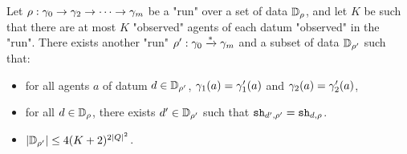 \begin{lemma}
	\label{lem:data-core-lemma}
	Let $\rho : \gamma_0 \to \gamma_2 \to \cdots \to \gamma_m$ be a "run"  over a set of data $\mathbb{D}_{\rho}$, and let $K$ be such that there are at most $K$ "observed" agents of each datum "observed" in the "run". There exists another "run" $\rho' : \gamma_0 \xrightarrow{*} \gamma_m$ and a subset of data $\mathbb{D}_{\rho'}$ such that:
	\begin{itemize}
		\item for all agents $a$ of datum $d \in \mathbb{D}_{\rho'}$, $\gamma_1(a) = \gamma'_1(a)$ and $\gamma_2(a) = \gamma'_2(a)$,
		
		\item for all $d \in \mathbb{D}_{\rho}$, there exists $d' \in \mathbb{D}_{\rho'}$ such that $\mathtt{sh}_{d',\rho'} = \mathtt{sh}_{d,\rho}$.
		
		\item $|\mathbb{D}_{\rho'}| \leq 4(K+2)^{2|Q|^2}$.
	\end{itemize}
\end{lemma}


